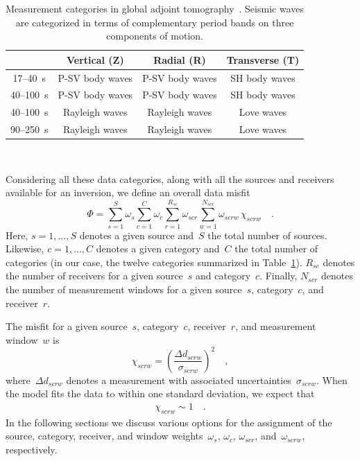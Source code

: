 \begin{table}
\caption[Measurement categories in global adjoint tomography]
{\small{Measurement categories in global adjoint tomography~\cite{bozdaug2016global, Lei2018}.
    Seismic waves are categorized in terms of complementary 
    period bands on three components of motion.}}
\begin{tabular}{|c|c|c|c|}
\hline

~         &  Vertical (Z) & Radial (R) &  Transverse (T) \\
\hline
17--40~s           &   P-SV body waves                        & P-SV body waves                       & SH body waves   \\
40--100~s         &   P-SV body waves                        & P-SV body waves                       & SH body waves \\
40--100~s         &   Rayleigh waves                           & Rayleigh waves                           & Love waves \\
90--250~s         &   Rayleigh waves                           & Rayleigh waves                           & Love waves \\
\hline
\end{tabular}\\
\label{table:categories}
\end{table}

Considering all these data categories, along with all the sources and receivers available for an inversion, we define an overall data misfit
\begin{equation}
\label{eq:misfit}
\Phi = \sum_{s=1}^{S} \omega_s \sum_{c=1}^{C} \omega_{c} \sum_{r=1}^{R_{sc}} \omega_{scr} \sum_{w=1}^{N_{scr}} \omega_{scrw}\, \chi_{scrw}
\quad .
\end{equation}
Here, $s = 1, ... , S$ denotes a given source and~$S$ the total number of sources.  Likewise, $c = 1, ..., C$ denotes a given category and~$C$  the total number of categories (in our case, the twelve categories summarized in Table~\ref{table:categories}).
$R_{sc}$ denotes the number of receivers for a given source~$s$ and category~$c$. Finally, $N_{scr}$ denotes the number of measurement windows for a given source~$s$, category~$c$, and receiver~$r$.

The misfit for a given source~$s$,
category~$c$, receiver~$r$, and measurement window~$w$ is
\begin{equation}
\label{eq:misfit_def}
\chi_{scrw} = \left(\frac{\Delta d_{scrw}}{\sigma_{scrw}}\right)^2
\quad ,
\end{equation}
where~$\Delta d_{scrw}$ denotes a measurement with associated uncertainties~$\sigma_{scrw}$.
When the model fits the data to within one standard deviation, we expect that
\begin{align}
\chi_{scrw} \sim 1
\quad .
\end{align}
In the following sections we discuss various options for the assignment of the 
source, category, receiver, and window weights~$\omega_s$,
$\omega_{c}$, $\omega_{scr}$, and~$ \omega_{scrw}$, respectively.
%
